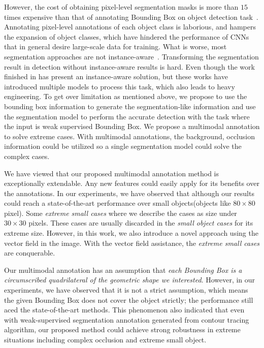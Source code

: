 \documentclass{article}
\begin{document}
{However, the cost of obtaining pixel-level segmentation masks is more than $15$ times expensive than that of annotating Bounding Box on object detection task~\cite{lin2014microsoft}. Annotating pixel-level annotations of each object class is laborious, and hampers the expansion of object classes, which have hindered the performance of CNNs that in general desire large-scale data for training. What is worse, most segmentation approaches are not instance-aware~\cite{dai2016fcn,dai2015convolutional,dai2016instance}. Transforming the segmentation result in detection without instance-aware results is hard. Even though the work finished in \cite{dai2016fcn,dai2016instance} has present an instance-aware solution, but these works have introduced multiple models to process this task, which also leads to heavy engineering.
To get over limitation as mentioned above, we propose to use the bounding box information to generate the segmentation-like information and use the segmentation model to perform the accurate detection with the task where the input is weak supervised Bounding Box. We propose a multimodal annotation to solve extreme cases. With multimodal annotations, the background, occlusion information could be utilized so a single segmentation model could solve the complex cases. 


We have viewed that our proposed multimodal annotation method is exceptionally extendable. Any new features could easily apply for its benefits over the annotations.
In our experiments, we have observed that although our results could reach a state-of-the-art performance over small objects(objects like $80 \times 80$ pixel). Some \textit{extreme small cases} where we describe the cases as size under $30\times 30$ pixels. These cases are usually discarded in the \textit{small object cases} for its extreme size. However, in this work, we also introduce a novel approach using the vector field in the image. With the vector field assistance, the \textit{extreme small cases} are conquerable. 


Our multimodal annotation has an assumption that \textit{each Bounding Box is a circumscribed quadrilateral of the geometric shape we interested}. However, in our experiments, we have observed that it is not a strict assumption, which means the given Bounding Box does not cover the object strictly; the performance still aced the state-of-the-art methods.
This phenomenon also indicated that even with weak-supervised segmentation annotation generated from contour tracing algorithm, our proposed method could achieve strong robustness in extreme situations including complex occlusion and extreme small object.


}
\end{document}
